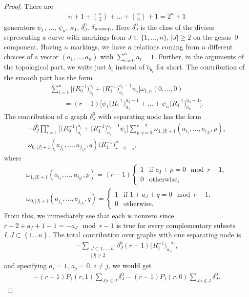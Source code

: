 \documentclass[10pt,a4paper]{amsart}
\numberwithin{equation}{section}
\begin{document}
\begin{proof}
 There are
 \begin{align*}
 n+1+\binom{n}{2}+\dots+\binom{n}{n}+1 = 2^n+1
 \end{align*}
 generators $\psi_1$, $\dots$, $\psi_n$, $\kappa_1$, $\delta^{0}_{J}$, $\delta_{\rm nonsep}$.
 Here $\delta^{0}_{J}$ is the class of the divisor representing a curve with markings from $J\subset \{1,\dots, n\}$, $|J|\geq 2$ on the genus~0 component.
Having $n$ markings, we have $n$ relations coming from $n$ different choices of a vector $(a_1,\dots,a_n)$ with $\sum^{n}_{i=0}a_i= 1$. Further, in the arguments of the topological part, we write just $b_i$ instead of $\widetilde{e}_{b_i}$ for short.
The contribution of the smooth part has the form
\begin{gather*}
\sum_{i=1}^{n}\big[\big(R^{-1}_{0}\big)^{a_i}_{a_i}+\big(R^{-1}_{1}\big)^{a_i-1}_{a_i}\psi_i\big]\omega_{1,n}(0,\dots,0)\\
\qquad=(r-1)\big[\psi_1 \big(R^{-1}_{1}\big)^{a_1-1}_{a_1}+\dots+\psi_n \big(R^{-1}_{1}\big)^{a_n-1}_{a_n}\big].
\end{gather*}
The contribution of a graph $\delta_J^0$ with separating node has the form
\begin{gather*}
-\delta^{0}_{J}\prod^{n}_{i=1}\big[\big(R^{-1}_{0}\big)^{a_i}_{a_i}+\big(R^{-1}_{1}\big)^{a_i-1}_{a_i}\psi_i\big]\sum^{r-2}_{p,q=0}\omega_{1, |I|+1}(a_{i_1},\dots,a_{i_{|I|}},p),\\
\omega_{0, |J|+1}(a_{j_1},\dots,a_{j_{|J|}},q)\big(R^{-1}_{1}\big)^{p}_{r-2-q},
\end{gather*}
where
\begin{gather*}
\omega_{1, |I|+1}(a_{i_1},\dots,a_{i_{|I|}},p) = (r-1)
\begin{cases}
1 & \text{if } a_I+p = 0 \mod r-1,\\
0 & \text{otherwise},
\end{cases}
\\
\omega_{0, |J|+1}(a_{j_1},\dots,a_{j_{|J|}},q) =
\begin{cases}
1 & \text{if } 1+a_J+q = 0 \mod r-1 ,\\
0 & \text{otherwise} .
\end{cases}
 \end{gather*}
From this, we immediately see that each
is nonzero since $r-2+a_I+1-1 = -a_J \mod r-1$ is true for every complementary subsets $I,J\subset \left\{1\dots n\right\}$. The total contribution over graphs with one separating node is
\begin{align*}
-\sum_{\substack{J\subset {1,\dots,n}\\|J|\geq 2}} \delta^{0}_{J}(r-1)\big(R^{-1}_{1}\big)^{-a_I}_{a_J},
\end{align*}
and specifying $a_i = 1$, $a_j = 0$, $i\neq j$, we would get
\begin{align*}
-(r-1)P_1(r,1)\sum_{J| i \in J} \delta^{0}_{J} -(r-1)P_1(r,0)\sum_{J| i \notin J} \delta^{0}_{J}.
\end{align*}


\end{proof}
\end{document}
